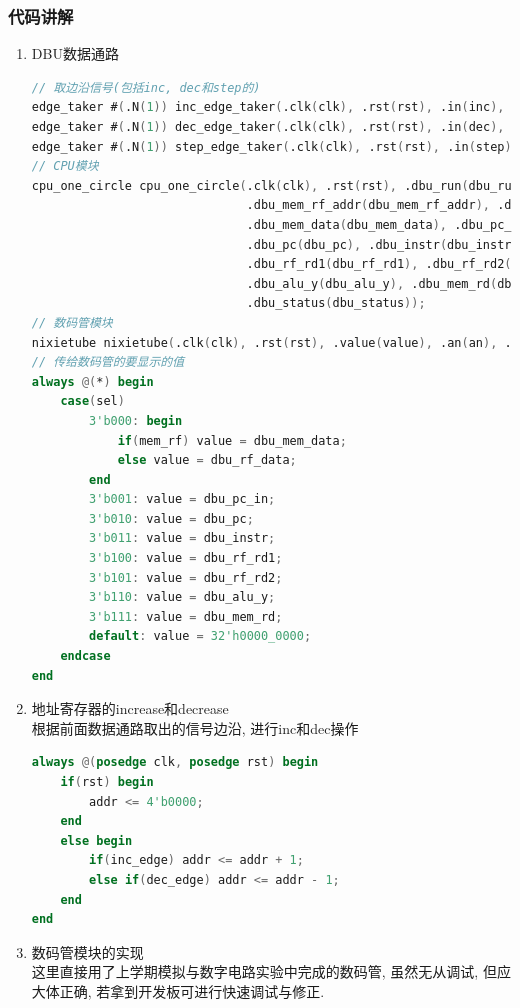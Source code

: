 \documentclass[UTF8]{article}
\begin{document}
\subsubsection{代码讲解}
\begin{enumerate}
	\item DBU数据通路
	\begin{lstlisting}[language=verilog]
// 取边沿信号(包括inc, dec和step的)
edge_taker #(.N(1)) inc_edge_taker(.clk(clk), .rst(rst), .in(inc), .out(inc_edge));
edge_taker #(.N(1)) dec_edge_taker(.clk(clk), .rst(rst), .in(dec), .out(dec_edge));
edge_taker #(.N(1)) step_edge_taker(.clk(clk), .rst(rst), .in(step), .out(dbu_run));
// CPU模块
cpu_one_circle cpu_one_circle(.clk(clk), .rst(rst), .dbu_run(dbu_run | succ),
                              .dbu_mem_rf_addr(dbu_mem_rf_addr), .dbu_rf_data(dbu_rf_data),
                              .dbu_mem_data(dbu_mem_data), .dbu_pc_in(dbu_pc_in),
                              .dbu_pc(dbu_pc), .dbu_instr(dbu_instr),
                              .dbu_rf_rd1(dbu_rf_rd1), .dbu_rf_rd2(dbu_rf_rd2),
                              .dbu_alu_y(dbu_alu_y), .dbu_mem_rd(dbu_mem_rd),
                              .dbu_status(dbu_status));
// 数码管模块
nixietube nixietube(.clk(clk), .rst(rst), .value(value), .an(an), .seg(seg));
// 传给数码管的要显示的值
always @(*) begin
    case(sel)
        3'b000: begin
            if(mem_rf) value = dbu_mem_data;
            else value = dbu_rf_data;
        end
        3'b001: value = dbu_pc_in;
        3'b010: value = dbu_pc;
        3'b011: value = dbu_instr;
        3'b100: value = dbu_rf_rd1;
        3'b101: value = dbu_rf_rd2;
        3'b110: value = dbu_alu_y;
        3'b111: value = dbu_mem_rd;
        default: value = 32'h0000_0000;
    endcase
end
	\end{lstlisting}
	
	\item 地址寄存器的increase和decrease\\
	根据前面数据通路取出的信号边沿, 进行inc和dec操作
	\begin{lstlisting}[language=verilog]
always @(posedge clk, posedge rst) begin
    if(rst) begin
        addr <= 4'b0000;
    end
    else begin
        if(inc_edge) addr <= addr + 1;
        else if(dec_edge) addr <= addr - 1;
    end
end
	\end{lstlisting}
	
	\item 数码管模块的实现\\
	这里直接用了上学期模拟与数字电路实验中完成的数码管, 虽然无从调试, 但应大体正确, 若拿到开发板可进行快速调试与修正.
	\begin{lstlisting}[language=verilog]


\end{lstlisting}
\end{enumerate}
\end{document}
